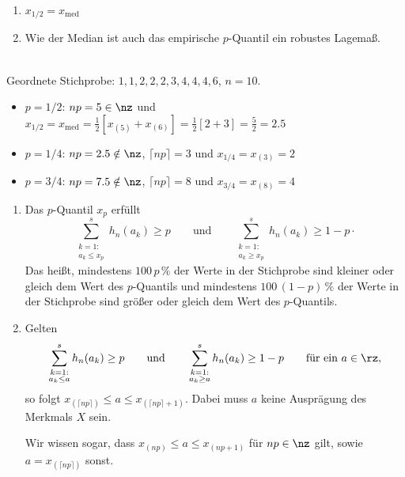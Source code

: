 \begin{bem} 
\begin{enumerate}[label=(\alph*)]
    \item $x_{1/2} = x_{\mathrm{med}}$
    \item Wie der Median ist auch das empirische $p$-Quantil ein robustes \gls{Lagemaß}.
\end{enumerate}
\end{bem}

\begin{bsp}  \\
    Geordnete Stichprobe: $1,1,2,2,2,3,4,4,4,6$, $n=10$.
    \begin{itemize}
        \item $p=1/2$: $np=5\in\nz$ und $x_{1/2}=x_{\mathrm{med}}=\frac12[x_{(5)}+x_{(6)}]=\frac12[2+3]=\frac52=2.5$
        \item $p=1/4$: $np=2.5\notin\nz$, $\lceil np\rceil=3$ und $x_{1/4}=x_{(3)}=2$
        \item $p=3/4$: $np=7.5\notin\nz$, $\lceil np\rceil=8$ und $x_{3/4}=x_{(8)}=4$
    \end{itemize}
\end{bsp}

\begin{satz} 
\begin{enumerate}[label=(\alph*)]
    \item Das $p$-Quantil $x_p$ erfüllt
    \[
        \sum_{\substack{k=1:\\ a_k\leq x_p}}^s h_n(a_k) \geq p \qquad\text{und}\qquad \sum_{\substack{k=1:\\ a_k\geq x_p}}^s h_n(a_k) \geq 1-p \cdot
    \]
    Das heißt, mindestens $100\,p\,\%$ der Werte in der Stichprobe sind kleiner oder gleich dem Wert des $p$-Quantils und mindestens $100\,(1-p)\,\%$ der Werte in der Stichprobe sind größer oder gleich dem Wert des $p$-Quantils.
    \item Gelten
    \[
        \sum_{\substack{k=1:\\ a_k\leq a}}^s h_n(a_k)\geq p \qquad\text{und}\qquad \sum_{\substack{k=1:\\ a_k\geq a}}^s h_n(a_k)\geq 1-p \qquad\text{für ein } a\in\rz ,
    \]
    so folgt $x_{(\lceil np\rceil)}\leq a\leq x_{(\lceil np\rceil+1)}$.
    Dabei muss $a$ keine Ausprägung des \gls{Merkmal}s $X$ sein.

    Wir wissen sogar, dass $x_{(np)}\leq a\leq x_{(np+1)}$ für $np\in\nz$ gilt, sowie $a=x_{(\lceil np\rceil)}$ sonst.
\end{enumerate}
\end{satz}

